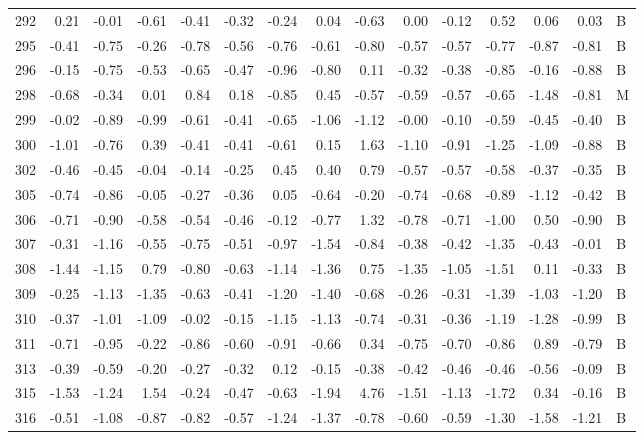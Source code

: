 \begin{table}[ht]
\begin{tabular}{rrrrrrrrrrrrrrl}
  292 & 0.21 & -0.01 & -0.61 & -0.41 & -0.32 & -0.24 & 0.04 & -0.63 & 0.00 & -0.12 & 0.52 & 0.06 & 0.03 & B \\ 
  295 & -0.41 & -0.75 & -0.26 & -0.78 & -0.56 & -0.76 & -0.61 & -0.80 & -0.57 & -0.57 & -0.77 & -0.87 & -0.81 & B \\ 
  296 & -0.15 & -0.75 & -0.53 & -0.65 & -0.47 & -0.96 & -0.80 & 0.11 & -0.32 & -0.38 & -0.85 & -0.16 & -0.88 & B \\ 
  298 & -0.68 & -0.34 & 0.01 & 0.84 & 0.18 & -0.85 & 0.45 & -0.57 & -0.59 & -0.57 & -0.65 & -1.48 & -0.81 & M \\ 
  299 & -0.02 & -0.89 & -0.99 & -0.61 & -0.41 & -0.65 & -1.06 & -1.12 & -0.00 & -0.10 & -0.59 & -0.45 & -0.40 & B \\ 
  300 & -1.01 & -0.76 & 0.39 & -0.41 & -0.41 & -0.61 & 0.15 & 1.63 & -1.10 & -0.91 & -1.25 & -1.09 & -0.88 & B \\ 
  302 & -0.46 & -0.45 & -0.04 & -0.14 & -0.25 & 0.45 & 0.40 & 0.79 & -0.57 & -0.57 & -0.58 & -0.37 & -0.35 & B \\ 
  305 & -0.74 & -0.86 & -0.05 & -0.27 & -0.36 & 0.05 & -0.64 & -0.20 & -0.74 & -0.68 & -0.89 & -1.12 & -0.42 & B \\ 
  306 & -0.71 & -0.90 & -0.58 & -0.54 & -0.46 & -0.12 & -0.77 & 1.32 & -0.78 & -0.71 & -1.00 & 0.50 & -0.90 & B \\ 
  307 & -0.31 & -1.16 & -0.55 & -0.75 & -0.51 & -0.97 & -1.54 & -0.84 & -0.38 & -0.42 & -1.35 & -0.43 & -0.01 & B \\ 
  308 & -1.44 & -1.15 & 0.79 & -0.80 & -0.63 & -1.14 & -1.36 & 0.75 & -1.35 & -1.05 & -1.51 & 0.11 & -0.33 & B \\ 
  309 & -0.25 & -1.13 & -1.35 & -0.63 & -0.41 & -1.20 & -1.40 & -0.68 & -0.26 & -0.31 & -1.39 & -1.03 & -1.20 & B \\ 
  310 & -0.37 & -1.01 & -1.09 & -0.02 & -0.15 & -1.15 & -1.13 & -0.74 & -0.31 & -0.36 & -1.19 & -1.28 & -0.99 & B \\ 
  311 & -0.71 & -0.95 & -0.22 & -0.86 & -0.60 & -0.91 & -0.66 & 0.34 & -0.75 & -0.70 & -0.86 & 0.89 & -0.79 & B \\ 
  313 & -0.39 & -0.59 & -0.20 & -0.27 & -0.32 & 0.12 & -0.15 & -0.38 & -0.42 & -0.46 & -0.46 & -0.56 & -0.09 & B \\ 
  315 & -1.53 & -1.24 & 1.54 & -0.24 & -0.47 & -0.63 & -1.94 & 4.76 & -1.51 & -1.13 & -1.72 & 0.34 & -0.16 & B \\ 
  316 & -0.51 & -1.08 & -0.87 & -0.82 & -0.57 & -1.24 & -1.37 & -0.78 & -0.60 & -0.59 & -1.30 & -1.58 & -1.21 & B \\ 

\end{tabular}
\end{table}
